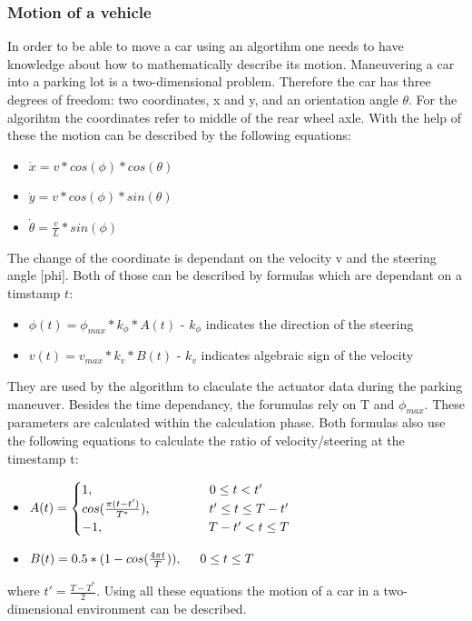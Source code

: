 \documentclass[paper=a4, fontsize=11pt]{scrreprt}
\begin{document}
\subsubsection{Motion of a vehicle}
In order to be able to move a car using an algortihm one needs to have knowledge about how to mathematically describe its motion. 
Maneuvering a car into a parking lot is a two-dimensional problem. Therefore the car has three degrees of freedom: two coordinates, x and y, and an orientation angle $\theta$. For the algorihtm the coordinates refer to middle of the rear wheel axle. With the help of these the motion can be described by the following equations:
\begin{itemize}
	\item $\dot{x} = v * cos(\phi) * cos(\theta)$
	\item $\dot{y} = v * cos(\phi) * sin(\theta)$
	\item $\dot{\theta} = \frac{v}{L} * sin(\phi)$
\end{itemize}
The change of the coordinate is dependant on the velocity v and the steering angle [phi]. Both of those can be described by formulas which are dependant on a timstamp $t$:
\begin{itemize}
	\item $\phi(t) = \phi_{max} * k_{\phi} * A(t)$ - $k_{\phi}$ indicates the direction of the steering
	\item $v(t) = v_{max} * k_{v} * B(t)$ - $k_{v}$ indicates algebraic sign of the velocity
\end{itemize}
They are used by the algorithm to claculate the actuator data during the parking maneuver. Besides the time dependancy, the forumulas rely on T and $\phi_{max}$. These parameters are calculated within the calculation phase. Both formulas also use the following equations to calculate the ratio of velocity/steering at the timestamp t:
\begin{itemize}
	\item $A(t) = \begin{cases}
					1, \hspace*{3,2cm} 0 \leq t < t'\\
					cos(\frac{\pi(t-t')}{T^*}), \hspace*{1,6cm} t' \leq t \leq T-t'\\
					-1, \hspace*{2,9cm} T-t' < t \leq T\\
				  \end{cases}$
	\item $B(t) = 0.5 * (1 - cos(\frac{4\pi t}{T})), \hspace*{0,5cm} 0 \leq t \leq T$ 
\end{itemize}
where $t' = \frac{T-T^*}{2}$. Using all these equations the motion of a car in a two-dimensional environment can be described.
\end{document}
